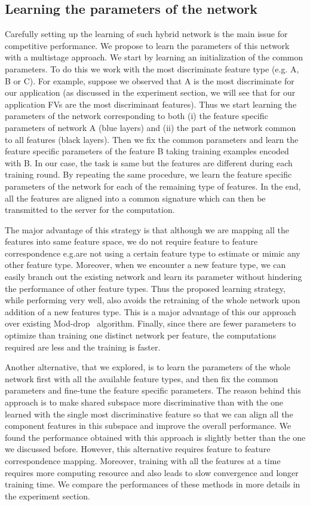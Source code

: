 \documentclass{sig-alternate-05-2015}
\begin{document}
\subsection{Learning the parameters of the network}Carefully setting up the learning of such hybrid network is the main issue for competitive performance. We propose to learn the parameters of this network with a multistage approach. We start by learning an initialization of the common parameters. To do this we work with the most discriminate feature type (e.g. A, B or C). For example, suppose we observed that A  is the most discriminate for our application (as discussed in the experiment section, we will see that for our application FVs are the most discriminant features). 
Thus we start learning the parameters of the network corresponding to both (i) the feature specific parameters of network A (blue layers) and (ii) the part of the network common to all features (black layers).  Then we fix the common parameters and learn the feature specific parameters of the feature B taking training examples encoded with B. In our case, the task is same but the features are different during each training round. By repeating the same procedure, we learn 
the feature specific parameters of the network for each of the remaining type of features. In the end, all the features are aligned into a common signature which can then be transmitted to the server for the computation. 

The major advantage of this strategy is that although we are mapping all the features into same feature space, we do not require feature to feature correspondence e.g.\we are not using a certain feature type to estimate or mimic any other feature type. Moreover, when we encounter a new feature type, we can easily branch out the existing network and learn its parameter without hindering the performance of other feature types. Thus the proposed learning strategy, while performing very well, also avoids the retraining of the whole network upon addition of a new features type. This is a major 
advantage of this our approach over existing Mod-drop~\cite{neverova2015oddrop} algorithm. Finally, since there are fewer parameters to optimize than training one distinct network per feature, the computations required are less and the training is faster.

Another alternative, that we explored, is to learn the parameters of the whole network first with all the available feature types, and then fix the common parameters 
and fine-tune the feature specific parameters. The reason behind this approach is to make shared subspace more discriminative than with the one learned with the single 
most discriminative feature so that we can align all the component features in this subspace and improve the  overall performance. We found the performance obtained with 
this approach is slightly better than the one we discussed before. However, this alternative requires feature to feature correspondence mapping. Moreover, training with all 
the features at a time requires more computing resource and also leads to slow convergence and longer training time. We compare the performances of these methods 
in more details in the experiment section. 
\end{document}
